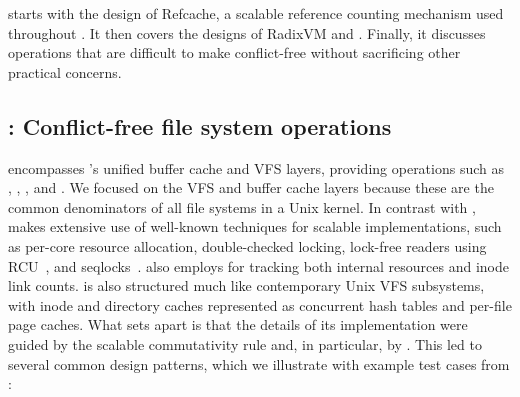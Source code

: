  starts with the design of Refcache, a scalable reference
counting mechanism used throughout \sys.  It then covers the designs
of RadixVM and \fs.  Finally, it discusses operations that are
difficult to make conflict-free without sacrificing other practical
concerns.






\subsection{\fs: Conflict-free file system operations}


\fs encompasses \sys's unified buffer cache and VFS layers, providing
operations such as , , , and
.  We focused on the VFS and buffer cache layers because
these are the common denominators of all file systems in a Unix
kernel.
%
In contrast with \vm,
\fs makes extensive use of well-known techniques for scalable
implementations, such as per-core resource
allocation, double-checked locking, lock-free readers using
RCU~\cite{rcu:linux},
and seqlocks~\cite[\S6]{lameter:linuxsync}.
%
\fs also employs  for tracking both internal resources and
inode link counts.
%
\fs is also structured much like contemporary Unix VFS subsystems,
with inode and directory caches represented as concurrent hash tables
and per-file page caches.
%
What sets \fs apart is that the details of its implementation were
guided by the scalable commutativity rule and, in particular, by
\tool.
%
This led to several common design patterns, which we illustrate with
example test cases from \tool{}:
%


